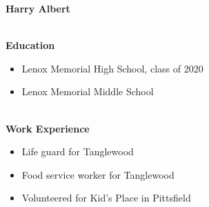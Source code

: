 \documentclass[10pt]{extarticle}
\begin{document}
\thispagestyle{empty}
\vspace{-\baselineskip}
\begin{center}
\Large \textbf{Harry Albert}
\end{center}
\vspace{-6.5ex}~\\ 
\textbf{Education}\\ 
\vspace{-\baselineskip}
\begin{itemize}[itemsep=0pt, topsep=0pt]
\item Lenox Memorial High School, class of 2020
\item Lenox Memorial Middle School
\end{itemize}~\\[-1ex]
\textbf{Work Experience}\\ 
\vspace{-\baselineskip}
\begin{itemize}[itemsep=0pt, topsep=0pt]
\item Life guard for Tanglewood
\item Food service worker for Tanglewood
\item Volunteered for Kid's Place in Pittsfield
\end{itemize}
\end{document}

